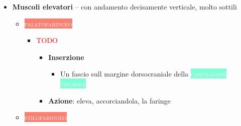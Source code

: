 \documentclass[italian,]{article}
\providecommand{\tightlist}{%
  \setlength{\itemsep}{0pt}\setlength{\parskip}{0pt}}
\newcommand{\mus}[1]{\colorbox{Salmon}{\textcolor{white}{\textsc{#1}}}}
\newcommand{\tol}[1]{\colorbox{Aquamarine}{\textcolor{white}{\textsc{#1}}}}
\renewcommand{\a}[1]{\underline{\textsc{#1}}}
\newcommand{\TODO}[1]{\textcolor{red}{\textsf{\footnotesize{TODO #1}}}} %
\begin{document}
\begin{itemize}
\begin{itemize}
\begin{itemize}
\begin{itemize}
        \begin{itemize}
        \tightlist
        \item
          \textbf{Origine} - Una porzione parte dalla \a{lingua} - Una
          porzione parte dalla \a{lina milo-ioidea}

          \begin{itemize}
          \tightlist
          \item
            \textbf{Inserzione}: \tol{rafe pterigomandibolare}, nella
            parte posteriore (va a sfiorare la
            \a{lamina pterigoidea mediale})

            \begin{itemize}
            \tightlist
            \item
              Anche qui le fibre sono a ventaglio: le fibre inferiori si
              portano in basso, coperte dal costrittore medio
            \item
              Le superiori vanno a fissarsi sul \a{tubercolo faringeo}
            \end{itemize}
          \end{itemize}
        \end{itemize}
      \end{itemize}
    \item
      Siccome le inserzioni sono laterali, la contrazione dei
      costrittori \textbf{restringe ma non chiude} il lume della faringe
    \item
      \textbf{Piega di \TODO{Passavat}} -- si ritrova nella parte
      interna alta della faringe, e funge da punto di arresto (e anche,
      in conseguenza, da sigillo) per la chiusura del palato molle
    \end{itemize}
  \end{itemize}
\item
  \textbf{Muscoli elevatori} -- con andamento decisamente verticale,
  molto sottili

  \begin{itemize}
  \item
    \mus{palatofaringeo}

    \begin{itemize}
    \item
      \TODO{}

      \begin{itemize}
      \tightlist
      \item
        \textbf{Inserzione}

        \begin{itemize}
        \tightlist
        \item
          Un fascio sull margine dorsocraniale della
          \tol{cartilagine tiroidea}
        \end{itemize}
      \item
        \textbf{Azione}: eleva, accorciandola, la faringe
      \end{itemize}
    \end{itemize}
  \item
    \mus{stilofaringeo}


\end{itemize}
\end{itemize}
\end{document}

